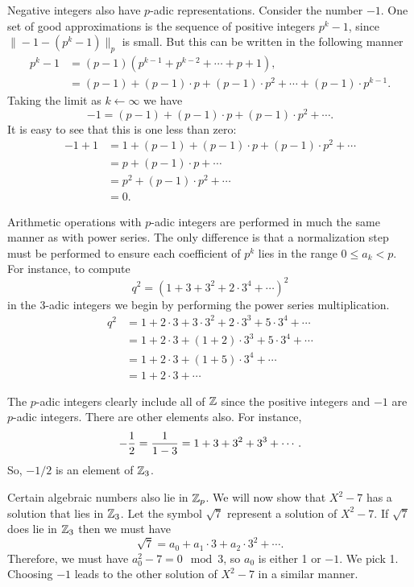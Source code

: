 Negative integers also have $p$-adic representations.  Consider the number
$-1$.  One set of good approximations is the sequence of positive integers
$p^k - 1$, since $\|-1 - (p^k -1) \|_p$ is small.  But this can be
written in the following manner
\[
\begin{aligned}
  p^k -1 & = (p-1)(p^{k-1} + p^{k-2} + \cdots + p + 1), \\
    & = (p-1) + (p-1)\cdot p + (p-1) \cdot p^2 + \cdots + (p-1) \cdot p^{k-1}.
\end{aligned}
\]
Taking the limit as $k \leftarrow \infty$ we have
\[
-1 = (p-1) + (p-1)\cdot p + (p-1) \cdot p^2 + \cdots .
\]
It is easy to see that this is one less than zero:
\[
\begin{aligned}
  -1 + 1 &=1 +  (p-1) + (p-1)\cdot p + (p-1) \cdot p^2 + \cdots \\
    &= p + (p-1) \cdot p + \cdots\\
    &= p^2 + (p-1) \cdot p^2 + \cdots\\
    &=0.
\end{aligned}
\]

\smallskip
Arithmetic operations with $p$-adic integers are performed in much the same
manner as with power series.  The only difference is that a normalization
step must be performed to ensure each coefficient of $p^k$ lies in the
range $0 \le a_k < p$.  For instance, to compute
\[
q^2 = (1 + 3 + 3^2 + 2\cdot 3^4 + \cdots)^2
\]
in the $3$-adic integers we begin by performing the power series
multiplication. 
\[
\begin{aligned}
  q^2&= 1 + 2\cdot 3 + 3 \cdot 3^2 + 2\cdot 3^3 + 5 \cdot 3^4 + \cdots\\
    &= 1 + 2\cdot 3 + (1 + 2) \cdot 3^3 + 5 \cdot 3^4 + \cdots\\
    &= 1 + 2 \cdot 3 + (1 + 5) \cdot 3^4 + \cdots\\
    &= 1 + 2 \cdot 3 + \cdots
\end{aligned}
\]

The $p$-adic integers clearly include all of $\mathbb{Z}$ since the positive
integers and $-1$ are $p$-adic integers.  There are other elements also.
For instance,
\[
-{1 \over 2} = {1 \over 1 - 3} = 1 + 3 + 3^2 + 3^3 + \cdots.
\]
So, $-1/2$ is an element of $\mathbb{Z}_3$.

Certain algebraic numbers also lie in $\mathbb{Z}_p$.  We will now show that $X^2 -
7$ has a solution that lies in $\mathbb{Z}_3$.  Let the symbol
$\sqrt{7}$ represent a solution of $X^2-7$.  
If $\sqrt{7}$ does lie in $\mathbb{Z}_3$ then we must have
\[
\sqrt{7} = a_0 + a_1 \cdot 3 + a_2 \cdot 3^2 + \cdots.
\]
Therefore, we must have $a_0^2 - 7 = 0 \mod{3}$, so $a_0$ is either 1
or $-1$.  We pick 1.  Choosing $-1$ leads to the other solution of $X^2 -
7$ in a similar manner.

